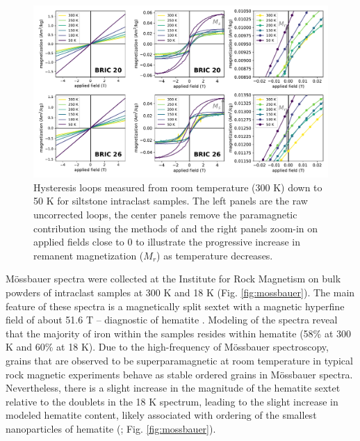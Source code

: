 \documentclass[draft]{agujournal2018}
\begin{document}
\begin{figure}[!ht]
\noindent\includegraphics[width=\textwidth]{figures/low_temp_loops.pdf}
\caption{\small{Hysteresis loops measured from room temperature (300 K) down to 50 K for siltstone intraclast samples. The left panels are the raw uncorrected loops, the center panels remove the paramagnetic contribution using the methods of \citet{Jackson2010a} and the right panels zoom-in on applied fields close to 0 to illustrate the progressive increase in remanent magnetization ($M_r$) as temperature decreases.}}
\label{fig:low_temp_loops}
\end{figure}
 
M{\"o}ssbauer spectra were collected at the Institute for Rock Magnetism on bulk powders of intraclast samples at 300 K and 18 K (Fig. \ref{fig:mossbauer}). The main feature of these spectra is a magnetically split sextet with a magnetic hyperfine field of about 51.6 T -- diagnostic of hematite \citep{Dyar2006a}. Modeling of the spectra reveal that the majority of iron within the samples resides within hematite (58\% at 300 K and 60\% at 18 K). Due to the high-frequency of M{\"o}ssbauer spectroscopy, grains that are observed to be superparamagnetic at room temperature in typical rock magnetic experiments behave as stable ordered grains in M{\"o}ssbauer spectra. Nevertheless, there is a slight increase in the magnitude of the hematite sextet relative to the doublets in the 18 K spectrum, leading to the slight increase in modeled hematite content, likely associated with ordering of the smallest nanoparticles of hematite (\citealp{Bodker2000a}; Fig. \ref{fig:mossbauer}).
\end{document}

